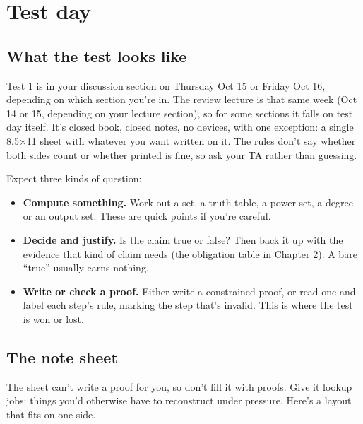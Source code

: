 \section{Test day}

\subsection{What the test looks like}
Test 1 is in your discussion section on Thursday Oct 15 or Friday Oct 16, depending on which section you're in. The review lecture is that same week (Oct 14 or 15, depending on your lecture section), so for some sections it falls on test day itself. It's closed book, closed notes, no devices, with one exception: a single 8.5$\times$11 sheet with whatever you want written on it. The rules don't say whether both sides count or whether printed is fine, so ask your TA rather than guessing.

Expect three kinds of question:
\begin{itemize}
\item \textbf{Compute something.} Work out a set, a truth table, a power set, a degree or an output set. These are quick points if you're careful.
\item \textbf{Decide and justify.} Is the claim true or false? Then back it up with the evidence that kind of claim needs (the obligation table in Chapter 2). A bare ``true'' usually earns nothing.
\item \textbf{Write or check a proof.} Either write a constrained proof, or read one and label each step's rule, marking the step that's invalid. This is where the test is won or lost.
\end{itemize}

\subsection{The note sheet}
The sheet can't write a proof for you, so don't fill it with proofs. Give it lookup jobs: things you'd otherwise have to reconstruct under pressure. Here's a layout that fits on one side.

